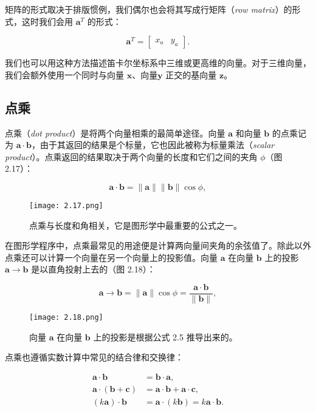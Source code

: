 \documentclass[lang=cn,12pt]{elegantbook}
\begin{document}
矩阵的形式取决于排版惯例，我们偶尔也会将其写成行矩阵（\textit{row matrix}）的形式，这时我们会用 $\mathbf{a}^T$ 的形式：

$$
  \mathbf{a}^T = \begin{bmatrix}
    x_a & y_a
  \end{bmatrix}.
$$

我们也可以用这种方法描述笛卡尔坐标系中三维或更高维的向量。对于三维向量，我们会额外使用一个同时与向量 $\mathbf{x}$、向量$\mathbf{y}$ 正交的基向量 $\mathbf{z}$。

\subsection{点乘}

点乘（\textit{dot product}）是将两个向量相乘的最简单途径。向量 $\mathbf{a}$ 和向量 $\mathbf{b}$ 的点乘记为  $\mathbf{a} \cdot \mathbf{b}$，由于其返回的结果是个标量，它也因此被称为标量乘法（\textit{scalar product}）。点乘返回的结果取决于两个向量的长度和它们之间的夹角 $\phi$（图 2.17）：

\begin{equation}
  \mathbf{a} \cdot \mathbf{b} = \|\mathbf{a}\| \|\mathbf{b}\| \cos\phi,
\end{equation}

\begin{figure}[htbp]
  \centering
  \texttt{[image: 2.17.png]}
  \caption{点乘与长度和角相关，它是图形学中最重要的公式之一。}
\end{figure}

在图形学程序中，点乘最常见的用途便是计算两向量间夹角的余弦值了。除此以外点乘还可以计算一个向量在另一个向量上的投影值。向量 $\mathbf{a}$ 在向量 $\mathbf{b}$ 上的投影 $\mathbf{a} \to \mathbf{b}$ 是以直角投射上去的（图 2.18）：

\begin{equation}
  \mathbf{a} \to \mathbf{b} = \|\mathbf{a}\| \cos\phi = \frac{\mathbf{a} \cdot \mathbf{b}}{\|\mathbf{b}\|},
\end{equation}

\begin{figure}[htbp]
  \centering
  \texttt{[image: 2.18.png]}
  \caption{向量 $\mathbf{a}$ 在向量 $\mathbf{b}$ 上的投影是根据公式 2.5 推导出来的。}
\end{figure}

点乘也遵循实数计算中常见的结合律和交换律：

\begin{equation}
  \begin{aligned}
    \mathbf{a} \cdot \mathbf{b}                & = \mathbf{b} \cdot \mathbf{a},                                   \\
    \mathbf{a} \cdot (\mathbf{b} + \mathbf{c}) & = \mathbf{a} \cdot \mathbf{b} + \mathbf{a} \cdot \mathbf{c},     \\
    (k\mathbf{a}) \cdot \mathbf{b}             & = \mathbf{a} \cdot (k\mathbf{b}) = k\mathbf{a} \cdot \mathbf{b}.
  \end{aligned}
\end{equation}
\end{document}
